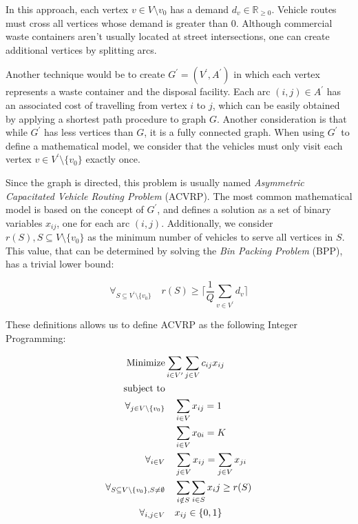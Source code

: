 In this approach, each vertex $v \in V \setminus {v_0}$ has a demand $d_v \in
\mathbb{R}_{\geq0}$. Vehicle routes must cross all vertices whose demand is
greater than $0$. Although commercial waste containers aren't usually located
at street intersections, one can create additional vertices by splitting arcs.

Another technique would be to create $G^\prime = (V^\prime, A^\prime)$ in which
each vertex represents a waste container and the disposal facility. Each arc
$(i, j) \in A^\prime$ has an associated cost of travelling from vertex $i$ to
$j$, which can be easily obtained by applying a shortest path procedure to
graph $G$. Another consideration is that while $G^\prime$ has less vertices
than $G$, it is a fully connected graph. When using $G^\prime$ to define a
mathematical model, we consider that the vehicles must only visit each vertex
$v \in V^\prime \setminus \{v_0\}$ exactly once.

Since the graph is directed, this problem is usually named \textit{Asymmetric
Capacitated Vehicle Routing Problem} (ACVRP).  The most common mathematical
model\citep{Toth01} is based on the concept of $G^\prime$, and defines a
solution as a set of binary variables $x_{ij}$, one for each arc $(i, j)$.
Additionally, we consider $r(S), S \subseteq V \setminus \{v_0\}$ as the
minimum number of vehicles to serve all vertices in $S$. This value, that can
be determined by solving the \textit{Bin Packing Problem} (BPP), has a trivial
lower bound:

\begin{equation}
\forall_{S \subseteq V^\prime \setminus \{v_0\}} \quad r(S) \geq
\lceil\frac{1}{Q} \sum_{v \in V^\prime} d_{v} \rceil
\end{equation}

These definitions allows us to define ACVRP as the following Integer Programming:

\begin{align}
	\mbox{Minimize} & \sum_{i \in V^\prime} \sum_{j \in V} c_{ij} x_{ij}
	\\
	\mbox{subject to} & \notag{}
	\\
	\forall_{j \in V \setminus \{v_0\}} & \quad \sum_{i \in V} x_{ij} = 1
	\label{acvrp:indegree}
	\\
	& \quad \sum_{i \in V} x_{0i} = K
	\label{acvrp:outdepot}
	\\
	\forall_{i \in V} & \quad \sum_{j \in V} x_{ij} = \sum_{j \in V} x_{ji}
	\label{acvrp:in-out}
	\\
	\forall_{S \subseteq V \setminus \{v_0\}, S \neq \emptyset} & \quad
	\sum_{i \notin S} \sum_{i \in S} x_ij \geq r(S)
	\label{acvrp:capacity}
	\\
	\forall_{i, j \in V} & \quad x_{ij} \in \{0, 1\}
\end{align}

